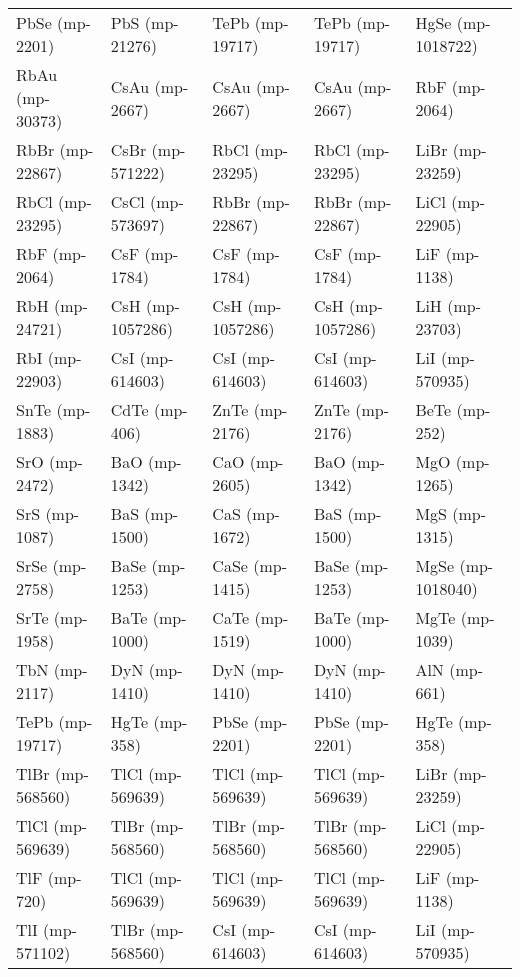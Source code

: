 \begin{longtable}{lllll}
   PbSe (mp-2201) &    PbS (mp-21276) &     TePb (mp-19717) &   TePb (mp-19717) &   HgSe (mp-1018722) \\
  RbAu (mp-30373) &    CsAu (mp-2667) &      CsAu (mp-2667) &    CsAu (mp-2667) &       RbF (mp-2064) \\
  RbBr (mp-22867) &  CsBr (mp-571222) &     RbCl (mp-23295) &   RbCl (mp-23295) &     LiBr (mp-23259) \\
  RbCl (mp-23295) &  CsCl (mp-573697) &     RbBr (mp-22867) &   RbBr (mp-22867) &     LiCl (mp-22905) \\
    RbF (mp-2064) &     CsF (mp-1784) &       CsF (mp-1784) &     CsF (mp-1784) &       LiF (mp-1138) \\
   RbH (mp-24721) &  CsH (mp-1057286) &    CsH (mp-1057286) &  CsH (mp-1057286) &      LiH (mp-23703) \\
   RbI (mp-22903) &   CsI (mp-614603) &     CsI (mp-614603) &   CsI (mp-614603) &     LiI (mp-570935) \\
   SnTe (mp-1883) &     CdTe (mp-406) &      ZnTe (mp-2176) &    ZnTe (mp-2176) &       BeTe (mp-252) \\
    SrO (mp-2472) &     BaO (mp-1342) &       CaO (mp-2605) &     BaO (mp-1342) &       MgO (mp-1265) \\
    SrS (mp-1087) &     BaS (mp-1500) &       CaS (mp-1672) &     BaS (mp-1500) &       MgS (mp-1315) \\
   SrSe (mp-2758) &    BaSe (mp-1253) &      CaSe (mp-1415) &    BaSe (mp-1253) &   MgSe (mp-1018040) \\
   SrTe (mp-1958) &    BaTe (mp-1000) &      CaTe (mp-1519) &    BaTe (mp-1000) &      MgTe (mp-1039) \\
    TbN (mp-2117) &     DyN (mp-1410) &       DyN (mp-1410) &     DyN (mp-1410) &        AlN (mp-661) \\
  TePb (mp-19717) &     HgTe (mp-358) &      PbSe (mp-2201) &    PbSe (mp-2201) &       HgTe (mp-358) \\
 TlBr (mp-568560) &  TlCl (mp-569639) &    TlCl (mp-569639) &  TlCl (mp-569639) &     LiBr (mp-23259) \\
 TlCl (mp-569639) &  TlBr (mp-568560) &    TlBr (mp-568560) &  TlBr (mp-568560) &     LiCl (mp-22905) \\
     TlF (mp-720) &  TlCl (mp-569639) &    TlCl (mp-569639) &  TlCl (mp-569639) &       LiF (mp-1138) \\
  TlI (mp-571102) &  TlBr (mp-568560) &     CsI (mp-614603) &   CsI (mp-614603) &     LiI (mp-570935) \\

\end{longtable}

